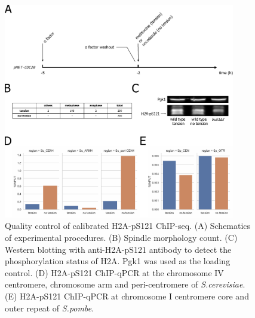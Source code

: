 \begin{figure}[htbp]
  \centering
  \includegraphics[width=0.9\textwidth]{chapter3/figures/checking.pdf}
  \caption[Quality control of calibrated H2A-pS121 ChIP-seq]{Quality control of calibrated H2A-pS121 ChIP-seq. (A) Schematics of experimental procedures. (B) Spindle morphology count. (C) Western blotting with anti-H2A-pS121 antibody to detect the phosphorylation status of H2A. Pgk1 was used as the loading control. (D) H2A-pS121 ChIP-qPCR at the chromosome IV centromere, chromosome arm and peri-centromere of \textit{S.cerevisiae}. (E) H2A-pS121 ChIP-qPCR at chromosome I centromere core and outer repeat of \textit{S.pombe}. }
  \label{fig:ph2achipseqchecking}
\end{figure}

